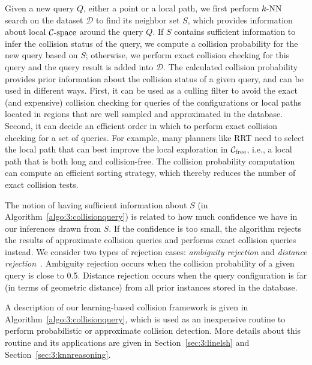 Given a new query $Q$, either a point or a local path, we first perform $k\text{-NN}$ search on the dataset $\mathcal D$ to find its neighbor set $S$, which provides information about local $\mathcal C\text{-space}$ around the query $Q$. If $S$ contains sufficient information to infer the collision status of the query, we compute a collision probability for the new query based on $S$; otherwise, we perform exact collision checking for this query and the query result is added into $\mathcal D$. The calculated collision probability provides prior information about the collision status of a given query, and can be used in different ways. First, it can be used as a culling filter to avoid the exact (and expensive) collision checking for queries of the configurations or local paths located in regions that are well sampled and approximated in the database. Second, it can decide an efficient order in which to perform exact collision checking for a set of queries. For example, many planners like RRT need to select the local path that can best improve the local exploration in $\mathcal C_{\text{free}}$, i.e., a local path that is both long and collision-free. The collision probability computation can compute an efficient sorting strategy, which thereby reduces the number of exact collision tests.

The notion of having sufficient information about $S$ (in Algorithm~\ref{algo:3:collisionquery}) is related to how much confidence we have in our inferences drawn from $S$. If the confidence is too small, the algorithm rejects the results of approximate collision queries and performs exact collision queries instead.
We consider two types of rejection cases: \emph{ambiguity rejection} and \emph{distance rejection}~\cite{Dubuisson:1993:PR}. Ambiguity rejection occurs when the collision probability of a given query is close to 0.5. Distance rejection occurs when the query configuration is far (in terms of geometric distance) from all prior instances stored in the database.

A description of our learning-based collision framework is given in Algorithm~\ref{algo:3:collisionquery}, which is used as an inexpensive routine to perform probabilistic or approximate collision detection. More details about this routine and its applications are given in Section~\ref{sec:3:linelsh} and Section~\ref{sec:3:knnreasoning}.




